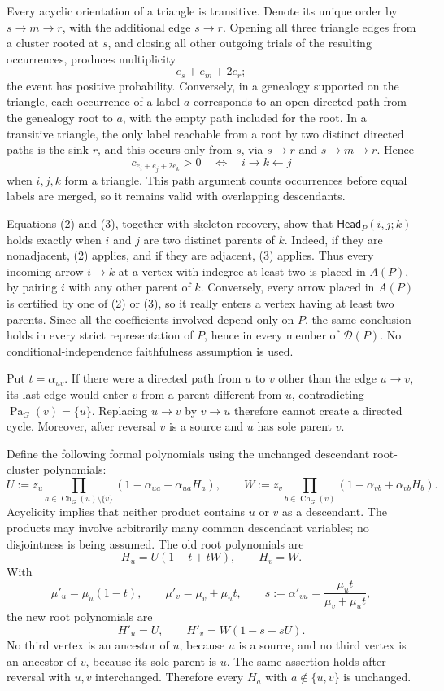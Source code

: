 Every acyclic orientation of a triangle is transitive.  Denote its unique order by \(s\to m\to r\), with the additional edge \(s\to r\).  Opening all three triangle edges from a cluster rooted at \(s\), and closing all other outgoing trials of the resulting occurrences, produces multiplicity
\[
 e_s+e_m+2e_r;
\]
the event has positive probability.  Conversely, in a genealogy supported on the triangle, each occurrence of a label \(a\) corresponds to an open directed path from the genealogy root to \(a\), with the empty path included for the root.  In a transitive triangle, the only label reachable from a root by two distinct directed paths is the sink \(r\), and this occurs only from \(s\), via \(s\to r\) and \(s\to m\to r\).  Hence
\[
 c_{e_i+e_j+2e_k}>0
 \quad\Longleftrightarrow\quad i\to k\leftarrow j
\tag{3}
\]
when \(i,j,k\) form a triangle.  This path argument counts occurrences before equal labels are merged, so it remains valid with overlapping descendants.

Equations (2) and (3), together with skeleton recovery, show that \(\mathsf{Head}_P(i,j;k)\) holds exactly when \(i\) and \(j\) are two distinct parents of \(k\).  Indeed, if they are nonadjacent, (2) applies, and if they are adjacent, (3) applies.  Thus every incoming arrow \(i\to k\) at a vertex with indegree at least two is placed in \(A(P)\), by pairing \(i\) with any other parent of \(k\).  Conversely, every arrow placed in \(A(P)\) is certified by one of (2) or (3), so it really enters a vertex having at least two parents.  Since all the coefficients involved depend only on \(P\), the same conclusion holds in every strict representation of \(P\), hence in every member of \(\mathcal D(P)\).  No conditional-independence faithfulness assumption is used.

Put \(t=\alpha_{uv}\).  If there were a directed path from \(u\) to \(v\) other than the edge \(u\to v\), its last edge would enter \(v\) from a parent different from \(u\), contradicting \(\operatorname{Pa}_G(v)=\{u\}\).  Replacing \(u\to v\) by \(v\to u\) therefore cannot create a directed cycle.  Moreover, after reversal \(v\) is a source and \(u\) has sole parent \(v\).

Define the following formal polynomials using the unchanged descendant root-cluster polynomials:
\[
 U:=z_u\prod_{a\in\operatorname{Ch}_G(u)\setminus\{v\}}
       (1-\alpha_{ua}+\alpha_{ua}H_a),
 \qquad
 W:=z_v\prod_{b\in\operatorname{Ch}_G(v)}
       (1-\alpha_{vb}+\alpha_{vb}H_b).
\]
Acyclicity implies that neither product contains \(u\) or \(v\) as a descendant.  The products may involve arbitrarily many common descendant variables; no disjointness is being assumed.  The old root polynomials are
\[
 H_u=U(1-t+tW),\qquad H_v=W.
\]
With
\[
 \mu'_u=\mu_u(1-t),\qquad
 \mu'_v=\mu_v+\mu_ut,
 \qquad
 s:=\alpha'_{vu}=\frac{\mu_ut}{\mu_v+\mu_ut},
\]
the new root polynomials are
\[
 H'_u=U,\qquad H'_v=W(1-s+sU).
\]
No third vertex is an ancestor of \(u\), because \(u\) is a source, and no third vertex is an ancestor of \(v\), because its sole parent is \(u\).  The same assertion holds after reversal with \(u,v\) interchanged.  Therefore every \(H_a\) with \(a\notin\{u,v\}\) is unchanged.

